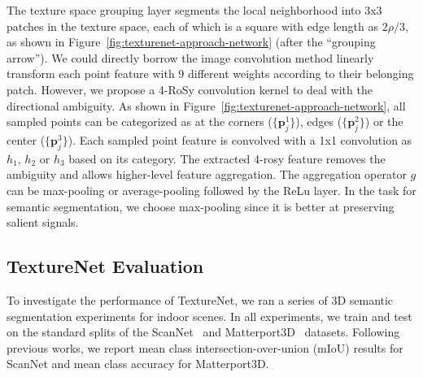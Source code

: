 The texture space grouping layer segments the local neighborhood into 3x3 patches in the texture space, each of which is a square with edge length as $2\rho/3$, as shown in Figure~\ref{fig:texturenet-approach-network} (after the ``grouping arrow''). We could directly borrow the image convolution method linearly transform each point feature with 9 different weights according to their belonging patch. However, we propose a 4-RoSy convolution kernel to deal with the directional ambiguity. As shown in Figure~\ref{fig:texturenet-approach-network}, all sampled points can be categorized as at the corners ($\{\mathbf{p}_j^1\}$), edges ($\{\mathbf{p}_j^2\}$) or the center ($\{\mathbf{p}_j^3\}$). Each sampled point feature is convolved with a 1x1 convolution as $h_1$, $h_2$ or $h_3$ based on its category. The extracted 4-rosy feature removes the ambiguity and allows higher-level feature aggregation. The  aggregation operator $g$ can be max-pooling or average-pooling followed by the ReLu layer. In the task for semantic segmentation, we choose max-pooling since it is better at preserving salient signals.

\subsection{TextureNet Evaluation}

To investigate the performance of TextureNet, we ran a series of 3D semantic segmentation experiments for indoor scenes.   In all experiments, we train and test on the standard splits of the ScanNet~\cite{dai2017scannet} and Matterport3D~\cite{dai2017scannet} datasets.  Following previous works, we report mean class intersection-over-union (mIoU) results for ScanNet and mean class accuracy for Matterport3D.

\label{sec:texturenet-eval-result}

